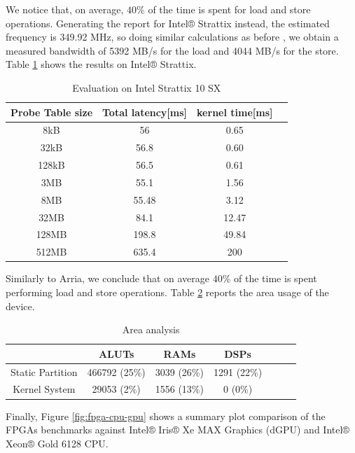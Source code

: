 \documentclass[sigconf, nonacm]{acmart}
\begin{document}
We notice that, on average, $40\%$ of the time is spent for load and store operations.
Generating the report for Intel® Strattix instead, the estimated frequency is 349.92 MHz, so doing similar calculations as before , we obtain a measured bandwidth of 5392 MB/s for the load and 4044 MB/s for the store.
Table \ref{tab:join-strattix} shows the results on Intel® Strattix.
\begin{table}[H]%
  \caption{Evaluation on Intel Strattix 10 SX}
  \label{tab:join-strattix}
  \begin{tabular}{cccl}
    \toprule
    Probe Table size & Total latency[ms] & kernel time[ms]\\
    \midrule
    8kB & 56& 0.65\\
    32kB & 56.8 & 0.60\\
    128kB & 56.5 & 0.61\\
    3MB & 55.1 & 1.56\\
    8MB & 55.48 & 3.12\\
    32MB & 84.1 & 12.47\\
    128MB & 198.8 & 49.84\\
    512MB & 635.4 & 200\\
  \bottomrule
\end{tabular}
\end{table}
Similarly to Arria, we conclude that on average $40\%$ of the time is spent performing load and store operations.
Table \ref{tab:area-join} reports the area usage of the device.
\begin{table}[H]%
  \caption{Area analysis}
  \label{tab:area-join}
  \begin{tabular}{ccccccl}
    \toprule
     & ALUTs  & RAMs & DSPs\\
    \midrule
    Static Partition & 466792 (25\%) & 3039 (26\%)  & 1291 (22\%)\\
    Kernel System & 29053 (2\%)  & 1556 (13\%)  & 0 (0\%)\\
  \bottomrule
\end{tabular}
\end{table}
Finally, Figure \ref{fig:fpga-cpu-gpu} shows a summary plot comparison of the FPGAs benchmarks against Intel® Iris® Xe MAX Graphics (dGPU) and Intel® Xeon® Gold 6128 CPU.
\end{document}

